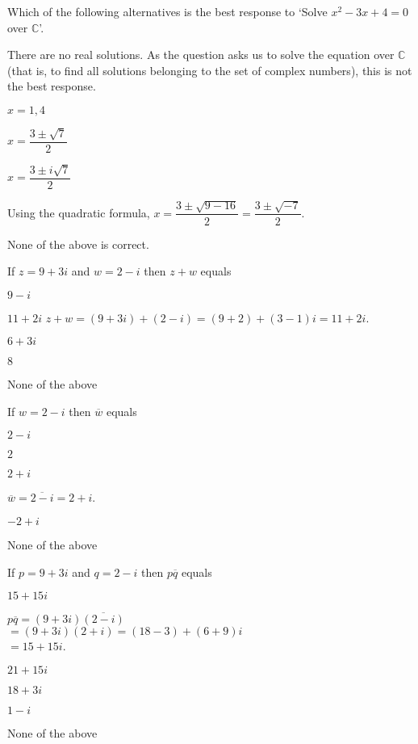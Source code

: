 \documentclass[pst2pdf]{webquiz}
\begin{document}
\begin{question}
Which of the following alternatives is the best response to `Solve
$x^{2}-3x+4=0$ over $\mathbb{C}$'.
\begin{choice}
\incorrect There are no real solutions.
\response As the question asks us to solve the equation over $\mathbb C$ (that is, to find all solutions belonging to the set of complex numbers), this is not the best response.

\incorrect $x=1,4$

\incorrect \(x=\dfrac{3\pm\sqrt{7}}{2}\)

\correct  \(x=\dfrac{3\pm i\sqrt{7}}{2}\)

\response Using the quadratic formula,
\(x =\dfrac{3\pm\sqrt{9-16}}{2} = \dfrac{3\pm\sqrt{-7}}{2}\).


\incorrect None of the above is correct.
\end{choice}
\end{question}

\begin{question}
If $z=9+3i$ and $w=2-i$ then $z+w$ equals
\begin{choice}
\incorrect $9-i$

\correct $11+2i$
\response $z+w=(9+3i)+(2-i)=(9+2)+(3-1)i=11+2i$.

\incorrect $6+3i$

\incorrect $8$

\incorrect None of the above

\end{choice}
\end{question}


\begin{question}
If $w=2-i$ then $\overline{w}$ equals
\begin{choice}
\incorrect $2-i$

\incorrect $2$

\correct $2+i$

\response
$\overline{w}=\overline{2-i}=2+i$.

\incorrect $-2+i$

\incorrect None of the above
\end{choice}
\end{question}

\begin{question}
If $p=9+3i$ and $q=2-i$ then $p\overline{q}$ equals
\begin{center}
\end{center}
\begin{choice}

\correct $15+15i$

\response
$p\overline{q}=(9+3i)\overline{(2-i)}$ \\
$=(9+3i)(2+i)= (18-3)+(6+9)i$\\
$=15+15i$.

\incorrect $21+15i$

\incorrect $18+3i$

\incorrect $1-i$

\incorrect None of the above

\end{choice}
\end{question}
\end{document}
